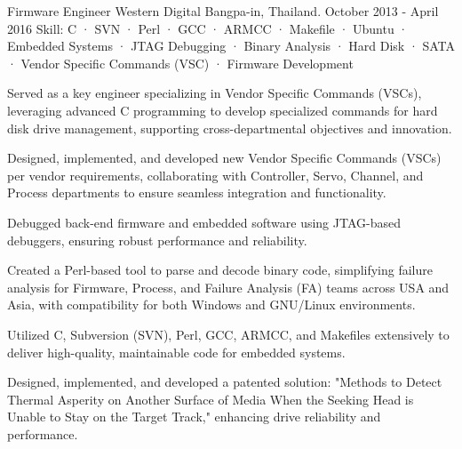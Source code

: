 \begin{cventries}
  \cventry
    {Firmware Engineer} %
    {Western Digital} %
    {Bangpa-in, Thailand.} %
    {October 2013 - April 2016} %
    {Skill: C · SVN · Perl · GCC · ARMCC · Makefile · Ubuntu · Embedded Systems · JTAG Debugging · Binary Analysis · Hard Disk · SATA · Vendor Specific Commands (VSC) · Firmware Development} %
    {
      \begin{cvitems} %
        \item {Served as a key engineer specializing in Vendor Specific Commands (VSCs), leveraging advanced C programming to develop specialized commands for hard disk drive management, supporting cross-departmental objectives and innovation.}
        \item {Designed, implemented, and developed new Vendor Specific Commands (VSCs) per vendor requirements, collaborating with Controller, Servo, Channel, and Process departments to ensure seamless integration and functionality.}
        \item {Debugged back-end firmware and embedded software using JTAG-based debuggers, ensuring robust performance and reliability.}
        \item {Created a Perl-based tool to parse and decode binary code, simplifying failure analysis for Firmware, Process, and Failure Analysis (FA) teams across USA and Asia, with compatibility for both Windows and GNU/Linux environments.}
        \item {Utilized C, Subversion (SVN), Perl, GCC, ARMCC, and Makefiles extensively to deliver high-quality, maintainable code for embedded systems.}
        \item {Designed, implemented, and developed a patented solution: "Methods to Detect Thermal Asperity on Another Surface of Media When the Seeking Head is Unable to Stay on the Target Track," enhancing drive reliability and performance.}
      \end{cvitems}
    }

\end{cventries}
